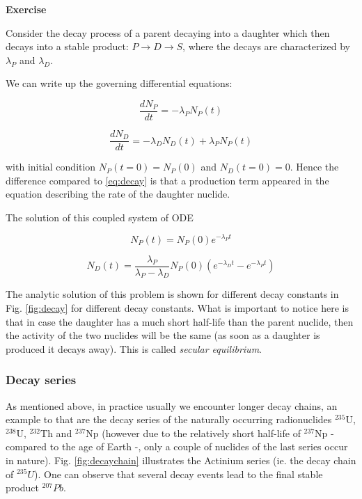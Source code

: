 \begin{tcolorbox}
\textbf{Exercise}

Consider the decay process of a parent decaying into a daughter which then decays into a stable product: $P\rightarrow D \rightarrow S$, where the decays are characterized by $\lambda_P$ and $\lambda_D$.

We can write up the governing differential equations:

$$\frac{dN_P}{dt}=-\lambda_P N_P(t)$$

$$\frac{dN_D}{dt}=-\lambda_D N_D(t) + \lambda_P N_P(t)$$

\noindent with initial condition $N_P(t=0)=N_P(0)$ and $N_D(t=0)=0$. Hence the difference compared to \eqref{eq:decay} is that a production term appeared in the equation describing the rate of the daughter nuclide.

The solution of this coupled system of ODE

$$ N_{P} (t) = N_P(0)e^{-\lambda_{P}t}$$

$$ N_{D} (t) = \frac{\lambda_P}{\lambda_P - \lambda_{D}}N_P(0)(e^{-\lambda_{D}t} - e^{-\lambda_{P}t}) $$

The analytic solution of this problem is shown for different decay constants in Fig. \ref{fig:decay} for different decay constants. What is important to notice here is that in case the daughter has a much short half-life than the parent nuclide, then the activity of the two nuclides will be the same (as soon as a daughter is produced it decays away). This is called \textit{secular equilibrium}.
\end{tcolorbox}

\subsubsection*{Decay series}

As mentioned above, in practice usually we encounter longer decay chains, an example to that are the decay series of the naturally occurring radionuclides ${}^{235}\text{U}$, ${}^{238}\text{U}$, ${}^{232}\text{Th}$ and ${}^{237}\text{Np}$ (however due to the relatively short half-life of ${}^{237}\text{Np}$ - compared to the age of Earth -, only a couple of nuclides of the last series occur in nature). Fig. \ref{fig:decaychain} illustrates the Actinium series (ie. the decay chain of ${}^{235}U$). One can observe that several decay events lead to the final stable product ${}^{207}Pb$.


